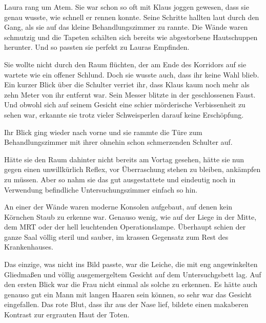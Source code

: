 Laura rang um Atem. Sie war schon so oft mit Klaus joggen gewesen, dass sie genau wusste, wie schnell er rennen konnte. Seine Schritte hallten laut durch den Gang, als sie auf das kleine Behandlungszimmer zu rannte. Die Wände waren schmutzig und die Tapeten schälten sich bereits wie abgestorbene Hautschuppen herunter. Und so passten sie perfekt zu Lauras Empfinden.

\par

Sie wollte nicht durch den Raum flüchten, der am Ende des Korridors auf sie wartete wie ein offener Schlund. Doch sie wusste auch, dass ihr keine Wahl blieb. Ein kurzer Blick über die Schulter verriet ihr, dass Klaus kaum noch mehr als zehn Meter von ihr entfernt war. Sein Messer blitzte in der geschlossenen Faust. Und obwohl sich auf seinem Gesicht eine schier mörderische Verbissenheit zu sehen war, erkannte sie trotz vieler Schweisperlen darauf keine Erschöpfung.

\par

Ihr Blick ging wieder nach vorne und sie rammte die Türe zum Behandlungszimmer mit ihrer ohnehin schon schmerzenden Schulter auf.

\par

Hätte sie den Raum dahinter nicht bereits am Vortag gesehen, hätte sie nun gegen einen unwillkürlich Reflex, vor Überraschung stehen zu bleiben, ankämpfen zu müssen. Aber so nahm sie das gut ausgestattete und eindeutig noch in Verwendung befindliche Untersuchungszimmer einfach so hin.

\par

An einer der Wände waren moderne Konsolen aufgebaut, auf denen kein Körnchen Staub zu erkenne war. Genauso wenig, wie auf der Liege in der Mitte, dem MRT oder der hell leuchtenden Operationslampe. Überhaupt schien der ganze Saal völlig steril und sauber, im krassen Gegensatz zum Rest des Krankenhauses.

\par

Das einzige, was nicht ins Bild passte, war die Leiche, die mit eng angewinkelten Gliedmaßen und völlig ausgemergeltem Gesicht auf dem Untersuchgsbett lag. Auf den ersten Blick war die Frau nicht einmal als solche zu erkennen. Es hätte auch genauso gut ein Mann mit langen Haaren sein können, so sehr war das Gesicht eingefallen. Das rote Blut, dass ihr aus der Nase lief, bildete einen makaberen Kontrast zur ergrauten Haut der Toten.

